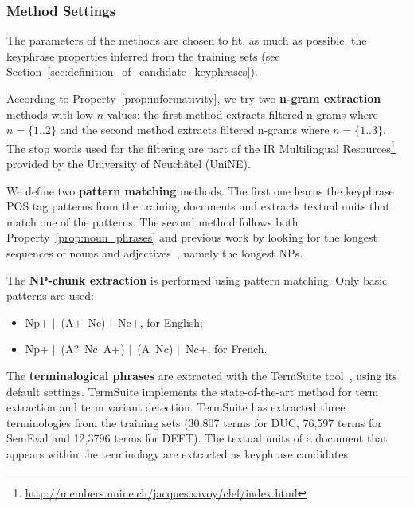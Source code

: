     \subsubsection{Method Settings}
    \label{subsubsec:method_settings}
      The parameters of the methods are chosen to fit, as much as possible, the
      keyphrase properties inferred from the training sets (see
      Section~\ref{sec:definition_of_candidate_keyphrases}).

      According to Property~\ref{prop:informativity}, we try two \textbf{n-gram
      extraction} methods with low $n$ values: the first method extracts
      filtered n-grams where $n = \{1..2\}$ and the second method extracts
      filtered n-grams where $n = \{1..3\}$. The stop words used for the
      filtering are part of the IR Multilingual
      Resources\footnote{\url{http://members.unine.ch/jacques.savoy/clef/index.html}}
      provided by the University of Neuchâtel (UniNE).

      We define two \textbf{pattern matching} methods. The first one learns the
      keyphrase POS tag patterns from the training documents and extracts
      textual units that match one of the patterns. The second method follows
      both Property~\ref{prop:noun_phrases} and previous work by looking for
      the longest sequences of nouns and
      adjectives~\cite{hassan2010conundrums}, namely the longest NPs.

      The \textbf{NP-chunk extraction} is performed using pattern matching. Only
      basic patterns are used:
      \begin{itemize}
        \item{Np+ $|$~(A+~Nc) $|$~Nc+, for English;}
        \item{Np+ $|$~(A?~Nc~A+) $|$~(A~Nc) $|$~Nc+, for French.}
      \end{itemize}


      The \textbf{terminalogical phrases} are extracted with the TermSuite
      tool~\cite{rocheteau2011termsuite}, using its default settings. TermSuite
      implements the state-of-the-art method for term extraction and term
      variant detection. TermSuite has extracted three terminologies from the
      training sets (30,807 terms for DUC, 76,597 terms for SemEval and 12,3796
      terms for DEFT). The textual units of a document that appears within the
      terminology are extracted as keyphrase candidates.

